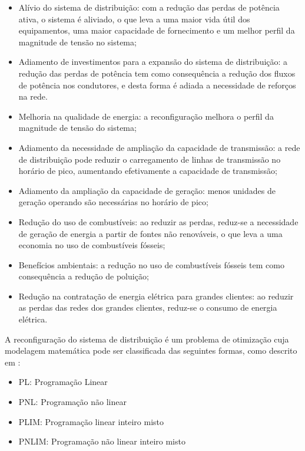 \begin{itemize}
    \item Alívio do sistema de distribuição: com a redução das perdas de potência ativa, o sistema é aliviado, o que leva a uma maior vida útil dos equipamentos, uma maior capacidade de fornecimento e um melhor perfil da magnitude de tensão no sistema;

    \item Adiamento de investimentos para a expansão do sistema de distribuição: a redução das perdas de potência tem como consequência a redução dos fluxos de potência nos condutores, e desta forma é adiada a necessidade de reforços na rede.
    
    \item Melhoria na qualidade de energia: a reconfiguração melhora o perfil da magnitude de tensão do sistema;
    
    \item Adiamento da necessidade de ampliação da capacidade de transmissão: a rede de distribuição pode reduzir o carregamento de linhas de transmissão no horário de pico, aumentando efetivamente a capacidade de transmissão;
    
    \item Adiamento da ampliação da capacidade de geração: menos unidades de geração operando são necessárias no horário de pico;
    
    \item Redução do uso de combustíveis: ao reduzir as perdas, reduz-se a necessidade de geração de energia a partir de fontes não renováveis, o que leva a uma economia no uso de combustíveis fósseis;
    
    \item Benefícios ambientais: a redução no uso de combustíveis fósseis tem como consequência a redução de poluição;
    
    \item Redução na contratação de energia elétrica para grandes clientes: ao reduzir as perdas das redes dos grandes clientes, reduz-se o consumo de energia elétrica.
\end{itemize}

A reconfiguração do sistema de distribuição é um problema de otimização cuja modelagem matemática pode ser classificada das seguintes formas, como descrito em \cite{Goncalves2013ModelosRadiais}:

\begin{itemize}
    \item PL: Programação Linear
    
    \item PNL: Programação não linear
    
    \item PLIM: Programação linear inteiro misto
    
    \item PNLIM: Programação não linear inteiro misto
\end{itemize}

